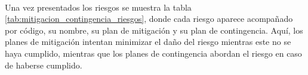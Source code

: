 \documentclass{subfiles}
\begin{document}

        \paragraph{}
        Una vez presentados los riesgos se muestra la tabla \ref{tab:mitigacion_contingencia_riesgos}, donde cada riesgo aparece acompañado por código, su nombre, su plan de mitigación y su plan de contingencia. Aquí, los planes de mitigación intentan minimizar el daño del riesgo mientras este no se haya cumplido, mientras que los planes de contingencia abordan el riesgo en caso de haberse cumplido.

\end{document}
